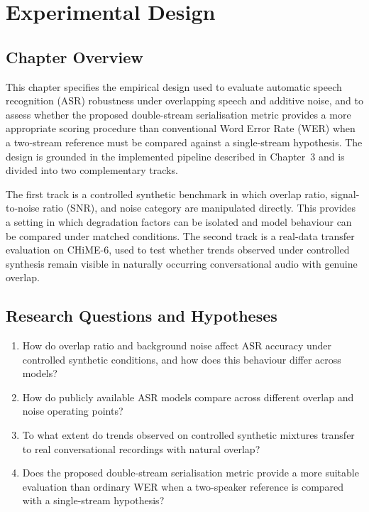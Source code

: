 \chapter{Experimental Design}
\label{chap:experimental_design}

\section{Chapter Overview}
This chapter specifies the empirical design used to evaluate automatic speech recognition (ASR) robustness under overlapping speech and additive noise, and to assess whether the proposed double-stream serialisation metric provides a more appropriate scoring procedure than conventional Word Error Rate (WER) when a two-stream reference must be compared against a single-stream hypothesis. The design is grounded in the implemented pipeline described in Chapter~3 and is divided into two complementary tracks.

The first track is a controlled synthetic benchmark in which overlap ratio, signal-to-noise ratio (SNR), and noise category are manipulated directly. This provides a setting in which degradation factors can be isolated and model behaviour can be compared under matched conditions. The second track is a real-data transfer evaluation on CHiME-6, used to test whether trends observed under controlled synthesis remain visible in naturally occurring conversational audio with genuine overlap.

\section{Research Questions and Hypotheses}
\begin{enumerate}[label=\textbf{RQ\arabic*:}, leftmargin=*]
    \item How do overlap ratio and background noise affect ASR accuracy under controlled synthetic conditions, and how does this behaviour differ across models?
    \item How do publicly available ASR models compare across different overlap and noise operating points?
    \item To what extent do trends observed on controlled synthetic mixtures transfer to real conversational recordings with natural overlap?
    \item Does the proposed double-stream serialisation metric provide a more suitable evaluation than ordinary WER when a two-speaker reference is compared with a single-stream hypothesis?
\end{enumerate}

